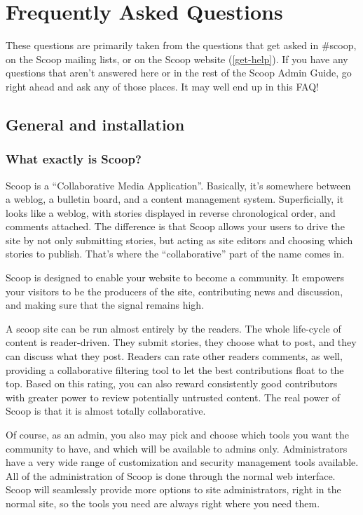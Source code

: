 \section{Frequently Asked Questions}
\label{faq}

These questions are primarily taken from the questions that get asked in \#scoop, on the Scoop mailing lists, or on the Scoop website (\ref{get-help}).  If you have any questions that aren't answered here or in the rest of the Scoop Admin Guide, go right ahead and ask any of those places.  It may well end up in this FAQ!

\subsection{General and installation}

\subsubsection{What exactly is Scoop?}

Scoop is a ``Collaborative Media Application''. Basically, it's somewhere between a weblog, a bulletin board, and a content management system. Superficially, it looks like a weblog, with stories displayed in reverse chronological order, and comments attached. The difference is that Scoop allows your users to drive the site by not only submitting stories, but acting as site editors and choosing which stories to publish. That's where the ``collaborative'' part of the name comes in.

Scoop is designed to enable your website to become a community. It empowers your visitors to be the producers of the site, contributing news and discussion, and making sure that the signal remains high.

A scoop site can be run almost entirely by the readers. The whole life-cycle of content is reader-driven. They submit stories, they choose what to post, and they can discuss what they post. Readers can rate other readers comments, as well, providing a collaborative filtering tool to let the best contributions float to the top. Based on this rating, you can also reward consistently good contributors with greater power to review potentially untrusted content. The real power of Scoop is that it is almost totally collaborative.

Of course, as an admin, you also may pick and choose which tools you want the community to have, and which will be available to admins only. Administrators have a very wide range of customization and security management tools available. All of the administration of Scoop is done through the normal web interface. Scoop will seamlessly provide more options to site administrators, right in the normal site, so the tools you need are always right where you need them.

